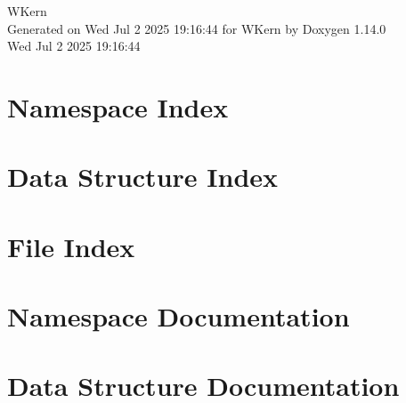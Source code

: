 \documentclass[twoside]{book}
\newcommand{\+}{\discretionary{\mbox{\scriptsize$\hookleftarrow$}}{}{}}
\newcommand{\clearemptydoublepage}{%
    \newpage{\pagestyle{empty}\cleardoublepage}%
  }
\begin{document}
  \raggedbottom
    \hypersetup{pageanchor=false,
                bookmarksnumbered=true,
                pdfencoding=unicode
               }
  \begin{titlepage}
  \vspace*{7cm}
  \begin{center}%
  {\Large WKern}\\
  \vspace*{1cm}
  {\large Generated on Wed Jul 2 2025 19\+:16\+:44 for WKern by Doxygen 1.14.0}\\
    \vspace*{0.5cm}
    {\small Wed Jul 2 2025 19:16:44}
  \end{center}
  \end{titlepage}
  \clearemptydoublepage
  \tableofcontents
  \clearemptydoublepage
  \hypersetup{pageanchor=true}

\chapter{Namespace Index}

\chapter{Data Structure Index}

\chapter{File Index}

\chapter{Namespace Documentation}







\chapter{Data Structure Documentation}














\end{document}
